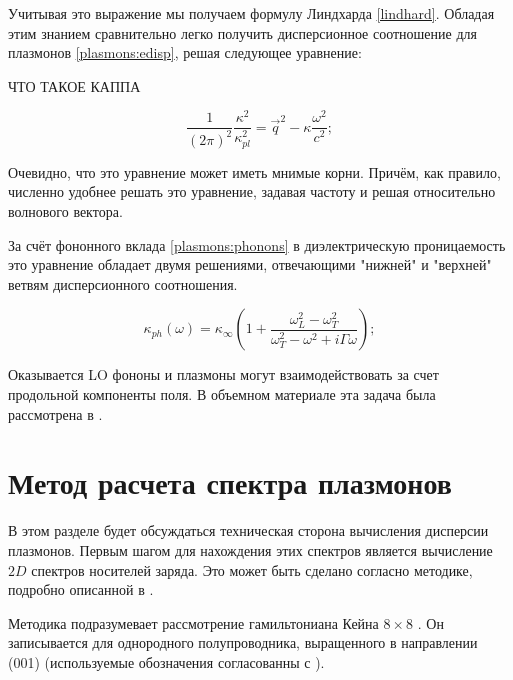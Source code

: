 \documentclass[../main.tex]{subfiles}
\begin{document}
    Учитывая это выражение мы получаем формулу Линдхарда \ref{lindhard}. Обладая 
    этим знанием сравнительно легко получить дисперсионное соотношение для плазмонов
    \ref{plasmons:edisp}, решая следующее уравнение:

ЧТО ТАКОЕ КАППА

    \begin{equation}
        \label{plasmons:disp}
        \frac{1}{(2\pi)^2}\frac{\kappa^2}{\kappa^2_{pl}} = 
        \vec{q}^2 - \kappa \frac{\omega^2}{c^2};
    \end{equation}
    
    Очевидно, что это уравнение может иметь мнимые корни. Причём, как правило,
    численно удобнее решать это уравнение, задавая частоту и решая относительно 
    волнового вектора.


    За счёт фононного вклада \cite{palik1998handbook} \ref{plasmons:phonons} в 
    диэлектрическую проницаемость это уравнение обладает двумя решениями, 
    отвечающими "нижней" и "верхней" ветвям дисперсионного соотношения.

    \begin{equation}
        \label{plasmons:phonons}
        \kappa_{ph}(\omega) = \kappa_\infty \left(
            1 + \frac{\omega_L^2 - \omega_T^2}{\omega_T^2-\omega^2 + i \Gamma \omega}
            \right);
    \end{equation}

    Оказывается LO фононы и плазмоны могут взаимодействовать за счет продольной компоненты поля.
    В объемном материале эта задача была рассмотрена в \cite{peter2002manuel}. 

    \section{Метод расчета спектра плазмонов}


    В этом разделе будет обсуждаться техническая сторона вычисления дисперсии плазмонов.
    Первым шагом для нахождения этих спектров является вычисление $2D$ спектров носителей заряда. 
    Это может быть сделано согласно методике, подробно описанной в \cite{HgCdTeCalcZholudev}.
    
    Методика подразумевает рассмотрение гамильтониана Кейна $8 \times 8$ \cite{Kane:Band:1957}. 
    Он записывается для однородного полупроводника, выращенного в направлении (001) 
    (используемые обозначения согласованны с \cite{Novik:2005}).
\end{document}
